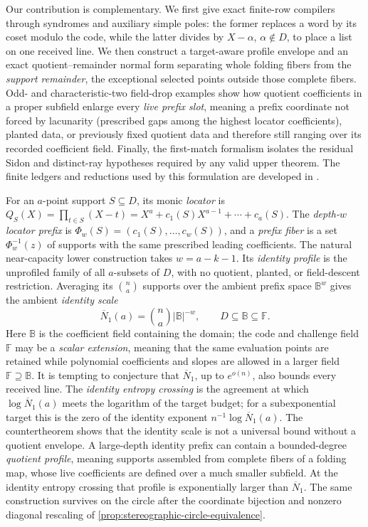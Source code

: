 \documentclass[12pt,a4paper]{amsart}
\numberwithin{equation}{section}
\theoremstyle{remark}
\newcommand{\F}{\mathbb F}
\newcommand{\B}{\mathbb B}
\newcommand{\barN}{\overline N}
\newcommand{\abs}[1]{\lvert #1\rvert}
\begin{document}
Our contribution is complementary.  We first give exact finite-row
compilers through syndromes and auxiliary simple poles: the former replaces
a word by its coset modulo the code, while the latter divides by
\(X-\alpha\), \(\alpha\notin D\), to place a list on one received line.
We then construct a target-aware profile envelope and an exact
quotient--remainder normal form separating whole folding fibers from the
\emph{support remainder}, the exceptional selected points outside those
complete fibers.  Odd- and characteristic-two
field-drop examples show how quotient coefficients in a proper subfield
enlarge every \emph{live prefix slot}, meaning a prefix coordinate not
forced by lacunarity (prescribed gaps among the highest locator
coefficients), planted data, or previously fixed quotient data and
therefore still ranging over its recorded coefficient field.  Finally, the first-match formalism
isolates the residual Sidon and distinct-ray hypotheses required by any
valid upper theorem.  The finite ledgers and
reductions used by this formulation are developed in
\cite{Cho26CapV13,Cho26Grande}.

For an \(a\)-point support \(S\subseteq D\), its monic
\emph{locator} is
\(Q_S(X)=\prod_{t\in S}(X-t)=X^a+c_1(S)X^{a-1}+\cdots+c_a(S)\).
The \emph{depth-\(w\) locator prefix} is
\(\Phi_w(S)=(c_1(S),\ldots,c_w(S))\), and a \emph{prefix fiber} is a
set \(\Phi_w^{-1}(z)\) of supports with the same prescribed leading
coefficients.  The natural near-capacity lower construction takes
\(w=a-k-1\).  Its \emph{identity profile} is the unprofiled family of
all \(a\)-subsets of \(D\), with no quotient, planted, or field-descent
restriction.  Averaging its \(\binom na\) supports over the ambient
prefix space \(\B^w\) gives the ambient \emph{identity scale}
\[
        \barN_1(a)=\binom na\abs\B^{-w},
        \qquad D\subseteq\B\subseteq\F.
        \tag{1.3}\label{eq:intro-identity-scale}
\]
Here \(\B\) is the coefficient field containing the domain; the code and
challenge field \(\F\) may be a \emph{scalar extension}, meaning that the
same evaluation points are retained while polynomial coefficients and
slopes are allowed in a larger field \(\F\supseteq\B\).  It is tempting to
conjecture that \(\barN_1\), up to \(e^{o(n)}\), also bounds every
received line.  The \emph{identity entropy crossing} is the agreement at
which \(\log\barN_1(a)\) meets the logarithm of the target budget; for a
subexponential target this is the zero of the identity exponent
\(n^{-1}\log\barN_1(a)\).  The
countertheorem shows that the identity scale is not a universal bound without a
quotient envelope.  A large-depth identity prefix can contain a bounded-degree
\emph{quotient profile}, meaning supports assembled from complete fibers
of a folding map, whose live coefficients are defined over a much smaller
subfield.  At the identity entropy crossing that profile is exponentially
larger than \(\barN_1\).  The same construction survives on the circle
after the coordinate bijection and nonzero diagonal rescaling of
\cref{prop:stereographic-circle-equivalence}.
\end{document}
